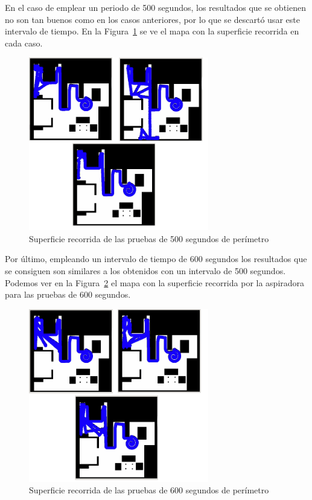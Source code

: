 En el caso de emplear un periodo de 500 segundos, los resultados que se obtienen no son tan buenos como en los casos anteriores, por lo que se descartó usar este intervalo de tiempo. En la Figura~\ref{fig.Referee500} se ve el mapa con la superficie recorrida en cada caso.\\

\begin{figure}[H]
  \begin{center}
    \includegraphics[width=0.7\textwidth]{figures/Vacuum/Referee500.png}
		\caption{Superficie recorrida de las pruebas de 500 segundos de perímetro}
		\label{fig.Referee500}
		\end{center}
\end{figure}

Por último, empleando un intervalo de tiempo de 600 segundos los resultados que se consiguen son similares a los obtenidos con un intervalo de 500 segundos. Podemos ver en la Figura~\ref{fig.Referee600} el mapa con la superficie recorrida por la aspiradora para las pruebas de 600 segundos. \\

\begin{figure}[H]
  \begin{center}
    \includegraphics[width=0.7\textwidth]{figures/Vacuum/Referee600.png}
		\caption{Superficie recorrida de las pruebas de 600 segundos de perímetro}
		\label{fig.Referee600}
		\end{center}
\end{figure}

